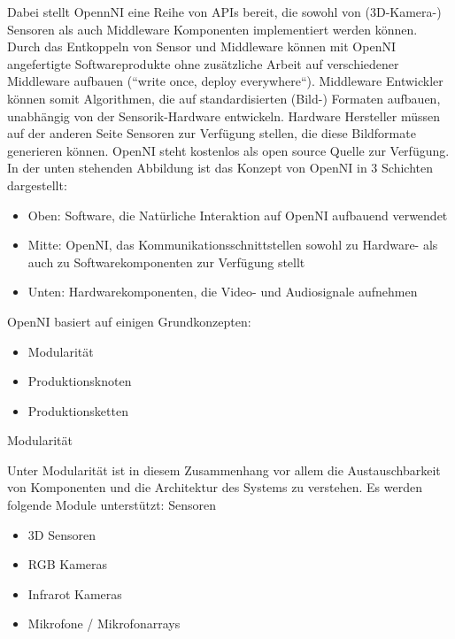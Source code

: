 Dabei stellt OpennNI eine Reihe von APIs bereit, die sowohl von  (3D-Kamera-) Sensoren als auch Middleware Komponenten implementiert werden können. Durch das Entkoppeln von Sensor und Middleware können mit OpenNI angefertigte Softwareprodukte ohne zusätzliche Arbeit auf verschiedener Middleware aufbauen (“write once, deploy everywhere“). Middleware Entwickler können somit Algorithmen, die auf standardisierten (Bild-) Formaten aufbauen, unabhängig von der Sensorik-Hardware entwickeln. Hardware Hersteller müssen auf der anderen Seite Sensoren zur Verfügung stellen, die diese Bildformate generieren können. OpenNI steht kostenlos als open source Quelle zur Verfügung. In der unten stehenden Abbildung ist das Konzept von OpenNI in 3 Schichten dargestellt:

\begin{itemize}
  \item Oben: Software, die Natürliche Interaktion auf OpenNI aufbauend verwendet
  \item Mitte: OpenNI, das Kommunikationsschnittstellen sowohl zu Hardware- als auch zu Softwarekomponenten zur Verfügung stellt
  \item Unten: Hardwarekomponenten, die Video- und Audiosignale aufnehmen
\end{itemize}


OpenNI basiert auf einigen Grundkonzepten:

\begin{itemize}
  \item Modularität
  \item Produktionsknoten
  \item Produktionsketten
\end{itemize}

Modularität

Unter Modularität ist in diesem Zusammenhang vor allem die Austauschbarkeit von Komponenten und die Architektur des Systems zu verstehen. Es werden folgende Module unterstützt:
Sensoren
\begin{itemize}
  \item 3D Sensoren
  \item RGB Kameras
  \item Infrarot Kameras
  \item Mikrofone / Mikrofonarrays
\end{itemize}

